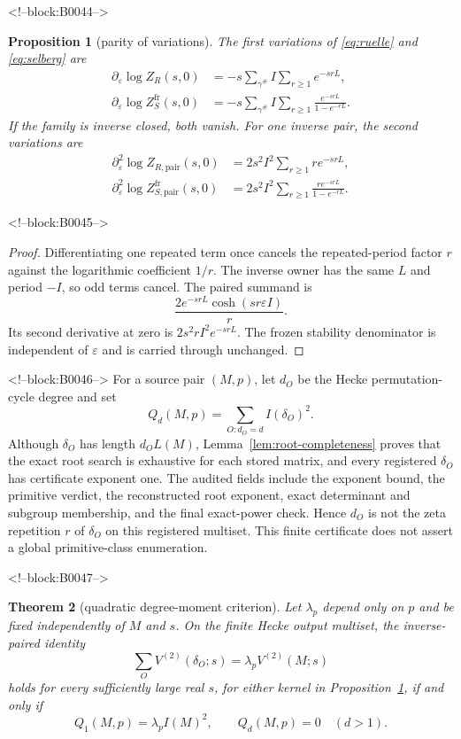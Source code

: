 \documentclass[11pt]{article}
\newtheorem{theorem}{Theorem}[section]
\newtheorem{proposition}[theorem]{Proposition}
\theoremstyle{definition}
\theoremstyle{remark}
\newcommand{\e}{\varepsilon}
\begin{document}
<!--block:B0044-->
\begin{proposition}[parity of variations]\label{prop:variations}
The first variations of \eqref{eq:ruelle} and \eqref{eq:selberg} are
\begin{align*}
\partial_\e\log Z_R(s,0)&=-s\sum_{\gamma^\#}I\sum_{r\geq1}e^{-srL},\\
\partial_\e\log Z_S^{\mathrm{fr}}(s,0)&=-s\sum_{\gamma^\#}I\sum_{r\geq1}\frac{e^{-srL}}{1-e^{-rL}}.
\end{align*}
If the family is inverse closed, both vanish. For one inverse pair, the second variations are
\begin{align*}
\partial_\e^2\log Z_{R,\mathrm{pair}}(s,0)
&=2s^2I^2\sum_{r\geq1}r e^{-srL},\\
\partial_\e^2\log Z_{S,\mathrm{pair}}^{\mathrm{fr}}(s,0)
&=2s^2I^2\sum_{r\geq1}\frac{r e^{-srL}}{1-e^{-rL}}.
\end{align*}
\end{proposition}

<!--block:B0045-->
\begin{proof}
Differentiating one repeated term once cancels the repeated-period factor $r$ against the logarithmic coefficient $1/r$. The inverse owner has the same $L$ and period $-I$, so odd terms cancel. The paired summand is
\[
\frac{2e^{-srL}\cosh(sr\e I)}r.
\]
Its second derivative at zero is $2s^2rI^2e^{-srL}$. The frozen stability denominator is independent of $\e$ and is carried through unchanged.
\end{proof}

<!--block:B0046-->
For a source pair $(M,p)$, let $d_O$ be the Hecke permutation-cycle degree and set
\[
Q_d(M,p)=\sum_{O:d_O=d} I(\delta_O)^2.
\]
Although $\delta_O$ has length $d_OL(M)$, Lemma~\ref{lem:root-completeness} proves that the exact root search is exhaustive for each stored matrix, and every registered $\delta_O$ has certificate exponent one. The audited fields include the exponent bound, the primitive verdict, the reconstructed root exponent, exact determinant and subgroup membership, and the final exact-power check. Hence $d_O$ is not the zeta repetition $r$ of $\delta_O$ on this registered multiset. This finite certificate does not assert a global primitive-class enumeration.

<!--block:B0047-->
\begin{theorem}[quadratic degree-moment criterion]\label{thm:moment}
Let $\lambda_p$ depend only on $p$ and be fixed independently of $M$ and $s$. On the finite Hecke output multiset, the inverse-paired identity
\[
\sum_O V^{(2)}(\delta_O;s)=\lambda_pV^{(2)}(M;s)
\]
holds for every sufficiently large real $s$, for either kernel in Proposition~\ref{prop:variations}, if and only if
\[
Q_1(M,p)=\lambda_p I(M)^2,
\qquad
Q_d(M,p)=0\quad(d>1).
\]
\end{theorem}
\end{document}
